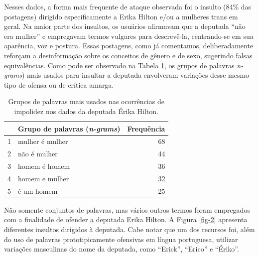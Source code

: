 \documentclass[portuguese]{textolivre}
\begin{document}
Nesses dados, a forma mais frequente de ataque observada foi o insulto (84\% das postagens) dirigido especificamente a Erika Hilton e/ou a mulheres trans em geral. Na maior parte dos insultos, os usuários afirmavam que a deputada ``não era mulher'' e empregavam termos vulgares para descrevê-la, centrando-se em sua aparência, voz e postura. Essas postagens, como já comentamos, deliberadamente reforçam a desinformação sobre os conceitos de gênero e de sexo, sugerindo falsas equivalências. Como pode ser observado na Tabela \ref{tab-2}, os grupos de palavras \textit{n-grams}) mais usados para insultar a deputada envolveram variações desse mesmo tipo de ofensa ou de crítica amarga.

\begin{table}[h!]
\centering
\begin{threeparttable}
\caption{Grupos de palavras mais usados nas ocorrências de impolidez nos dados da deputada Érika Hilton.}\label{tab-2}
\begin{tabular}{rlr}
\toprule
 & Grupo de palavras (\textit{n-grams}) & Frequência \\
\midrule
1 & mulher é mulher & 68 \\
2 & não é mulher & 44 \\
3 & homem é homem & 36 \\
4 & homem e mulher & 32 \\
5 & é um homem & 25 \\
\bottomrule
\end{tabular}
\end{threeparttable}
\end{table}

Não somente conjuntos de palavras, mas vários outros termos foram empregados com a finalidade de ofender a deputada Erika Hilton. A Figura \ref{fig-2} apresenta diferentes insultos dirigidos à deputada. Cabe notar que um dos recursos foi, além do uso de palavras prototipicamente ofensivas em língua portuguesa, utilizar variações masculinas do nome da deputada, como ``Erick'', ``Erico'' e ``Ériko''.
\end{document}
